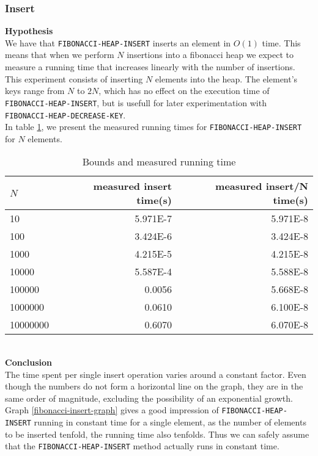 \documentclass[a4paper,10pt]{article}
\begin{document}
\subsubsection{Insert}
{\bf Hypothesis}\\
We have that \texttt{FIBONACCI-HEAP-INSERT} inserts an element in $O(1)$ time. This means that when we perform $N$ insertions into a fibonacci heap we expect to measure a running time that increases linearly with the number of insertions.\\
This experiment consists of inserting $N$ elements into the heap. The element's keys range from $N$ to $2N$, which has no effect on the execution time of \texttt{FIBONACCI\--HEAP\--INSERT}, but is usefull for later experimentation with \texttt{FIBONACCI\--HEAP\--DECREASE\--KEY}.\\
In table \ref{fibonacci-insert-table}, we present the measured running times for \texttt{FIBONACCI\--HEAP\--INSERT} for $N$ elements.
\begin{table}
  \begin{center}
    \begin{tabular}{l|r|r}
      $N$ & measured insert time(s) & measured insert/N time(s)\\
      \hline
      10       & \num{5.971E-7}     & \num{5.971E-8}\\
      100      & \num{3.424E-6}     & \num{3.424E-8}\\
      1000     & \num{4.215E-5}     & \num{4.215E-8}\\
      10000    & \num{5.587E-4}     & \num{5.588E-8}\\
      100000   & \num{0.0056}       & \num{5.668E-8}\\
      1000000  & \num{0.0610}       & \num{6.100E-8}\\
      10000000 & \num{0.6070}       & \num{6.070E-8}
    \end{tabular}
    \caption{Bounds and measured running time}
    \label{fibonacci-insert-table}
  \end{center}
\end{table}\\
{\bf Conclusion}\\
The time spent per single insert operation varies around a constant factor. Even though the numbers do not form a horizontal line on the graph, they are in the same order of magnitude, excluding the possibility of an exponential growth. Graph \ref{fibonacci-insert-graph} gives a good impression of \texttt{FIBONACCI-HEAP-INSERT} running in constant time for a single element, as the number of elements to be inserted tenfold, the running time also tenfolds. Thus we can safely assume that the \texttt{FIBONACCI-HEAP-INSERT} method actually runs in constant time.
\end{document}
